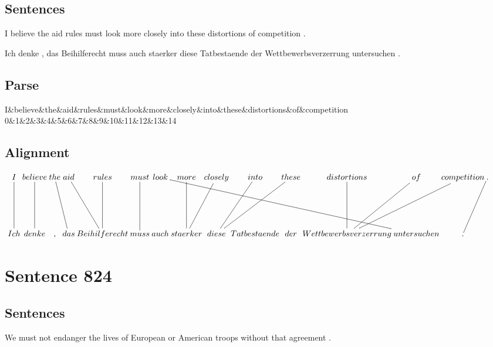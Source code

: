 \documentclass{report}
\begin{document}
\subsection*{Sentences}
I believe the aid rules must look more closely into these distortions of competition .

\noindent Ich denke , das Beihilferecht muss auch staerker diese Tatbestaende der Wettbewerbsverzerrung untersuchen .



\subsection*{Parse}
\begin{dependency}[theme=simple]
\begin{deptext}[column sep=.5cm, row sep=.1ex]
I\&believe\&the\&aid\&rules\&must\&look\&more\&closely\&into\&these\&distortions\&of\&competition\\
0\&1\&2\&3\&4\&5\&6\&7\&8\&9\&10\&11\&12\&13\&14\\
\end{deptext}
\end{dependency}


\subsection*{Alignment}
\scriptsize{
$
\xymatrix@C-2.3pc{
I \ar @{-} [dd] & believe \ar @{-} [dd] & the \ar @{-} [ddr] & aid \ar @{-} [ddr] & rules \ar @{-} [dd] & must \ar @{-} [dd] & look \ar @{-} [ddrrrrrr] & more \ar @{-} [dd] & closely \ar @{-} [ddl] & into \ar @{-} [ddl] & these \ar @{-} [ddll] & distortions \ar @{-} [dd] & of \ar @{-} [ddl] & competition \ar @{-} [ddll] & . \ar @{-} [ddl]\\\\
Ich & denke & , & das & Beihilferecht & muss & auch & staerker & diese & Tatbestaende & der & Wettbewerbsverzerrung & untersuchen & .
}$}
\newpage\section*{Sentence 824}

\subsection*{Sentences}
We must not endanger the lives of European or American troops without that agreement .
\end{document}
